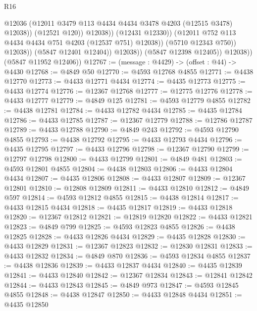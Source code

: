 \begin{lexlean}{R16}
\begin{coremodule}
                                    @12036
                                    (@12011
                                      @3479
                                      @113
                                      @4434
                                      @4434
                                      @3478
                                      @4203
                                      (@12515 @3478)
                                      @12038))
                                  (@12521 @120))
                                @12038))
                            (@12431 @12330))
                          (@12011 @752 @113 @4434 @4434 @751 @4203 (@12537 @751) @12038))
                        (@5710 @12343 @750))
                      @12038))
                  (@5847 @12401 @12404))
                @12038))
            (@5847 @12398 @12405))
          @12038))
      (@5847 @11952 @12406))
@12767 := (message : @4429) -> (offset : @44) -> @4430
@12768 := @4849 @50
@12770 := @4593 @12768 @4855
@12771 := @4438 @12770
@12773 := @4433 @12771 @4434
@12774 := @4435 @12773
@12775 := @4433 @12774
@12776 := @12367 @12768
@12777 := @12775 @12776
@12778 := @4433 @12777
@12779 := @4849 @125
@12781 := @4593 @12779 @4855
@12782 := @4438 @12781
@12784 := @4433 @12782 @4434
@12785 := @4435 @12784
@12786 := @4433 @12785
@12787 := @12367 @12779
@12788 := @12786 @12787
@12789 := @4433 @12788
@12790 := @4849 @243
@12792 := @4593 @12790 @4855
@12793 := @4438 @12792
@12795 := @4433 @12793 @4434
@12796 := @4435 @12795
@12797 := @4433 @12796
@12798 := @12367 @12790
@12799 := @12797 @12798
@12800 := @4433 @12799
@12801 := @4849 @481
@12803 := @4593 @12801 @4855
@12804 := @4438 @12803
@12806 := @4433 @12804 @4434
@12807 := @4435 @12806
@12808 := @4433 @12807
@12809 := @12367 @12801
@12810 := @12808 @12809
@12811 := @4433 @12810
@12812 := @4849 @597
@12814 := @4593 @12812 @4855
@12815 := @4438 @12814
@12817 := @4433 @12815 @4434
@12818 := @4435 @12817
@12819 := @4433 @12818
@12820 := @12367 @12812
@12821 := @12819 @12820
@12822 := @4433 @12821
@12823 := @4849 @799
@12825 := @4593 @12823 @4855
@12826 := @4438 @12825
@12828 := @4433 @12826 @4434
@12829 := @4435 @12828
@12830 := @4433 @12829
@12831 := @12367 @12823
@12832 := @12830 @12831
@12833 := @4433 @12832
@12834 := @4849 @870
@12836 := @4593 @12834 @4855
@12837 := @4438 @12836
@12839 := @4433 @12837 @4434
@12840 := @4435 @12839
@12841 := @4433 @12840
@12842 := @12367 @12834
@12843 := @12841 @12842
@12844 := @4433 @12843
@12845 := @4849 @973
@12847 := @4593 @12845 @4855
@12848 := @4438 @12847
@12850 := @4433 @12848 @4434
@12851 := @4435 @12850

\end{coremodule}
\end{lexlean}
